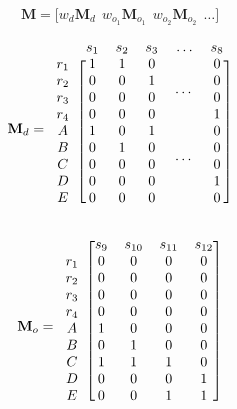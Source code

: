 \begin{equation}\label{eq:horzcat}
\mathbf{M} = \bigg[w_d\mathbf{M}_d ~~ w_{o_1}\mathbf{M}_{o_1} ~~ w_{o_2}\mathbf{M}_{o_2} ~~ \dots\bigg]
\end{equation}
\begin{minipage}[c]{0.5\textwidth}\centering
\begin{equation}\label{eq:Md}
\mathbf{M}_d=\begin{blockarray}{cccccc}
                  ~     &  s_1  &  s_2  &  s_3  & \dots &  s_8  \cr
            \begin{block}{c[ccccc]}
                 r_1    &   1   &   1   &   0   &\multirow{4}{*}{\dots} &   0   \cr
                 r_2    &   0   &   0   &   1   &       &   0   \cr
                 r_3    &   0   &   0   &   0   &       &   0   \cr
                 r_4    &   0   &   0   &   0   &       &   1   \cr
                  A     &   1   &   0   &   1   &\multirow{4}{*}{\dots} &   0   \cr
                  B     &   0   &   1   &   0   &       &   0   \cr
                  C     &   0   &   0   &   0   &       &   0   \cr
                  D     &   0   &   0   &   0   &       &   1   \cr
                  E     &   0   &   0   &   0   &       &   0   \cr
            \end{block}
        \end{blockarray}
\end{equation}
\end{minipage}
\begin{minipage}[c]{0.5\textwidth}\centering
\begin{equation}\label{eq:Mo}
\mathbf{M}_o=\begin{blockarray}{ccccc}
            \begin{block}{c[cccc]}
                  ~     &  s_9  & s_{10}& s_{11}& s_{12}\cr
                 r_1    &   0   &   0   &   0   &   0   \cr
                 r_2    &   0   &   0   &   0   &   0   \cr
                 r_3    &   0   &   0   &   0   &   0   \cr
                 r_4    &   0   &   0   &   0   &   0   \cr
                  A     &   1   &   0   &   0   &   0   \cr
                  B     &   0   &   1   &   0   &   0   \cr
                  C     &   1   &   1   &   1   &   0   \cr
                  D     &   0   &   0   &   0   &   1   \cr
                  E     &   0   &   0   &   1   &   1   \cr
            \end{block}
        \end{blockarray}
\end{equation}
\end{minipage}



